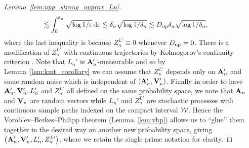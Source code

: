 \begin{proof}[Lemma~\ref{lem:app_strong_approx_Ln}]
\begin{align*}
    &\lesssim
    \int_0^{\delta_n}
    \sqrt{\log 1/\varepsilon}
    \,\mathrm{d}\varepsilon
    \lesssim
    \delta_n \sqrt{\log 1/\delta_n}
    \lesssim
    D_{\textup{up}}
    \delta_n \sqrt{\log 1/\delta_n},
  \end{align*}
  where the last inequality is because
  $Z_n^{L\prime} \equiv 0$ whenever $D_{\textup{up}} = 0$.
  There is a modification of $Z_n^{L\prime}$
  with continuous trajectories
  by Kolmogorov's continuity criterion
  \citep[Theorem~2.9]{legall2016brownian}.
  Note that $L_n'$ is $\mathbf{A}_n'$-measurable
  and so by Lemma~\ref{lem:kmt_corollary}
  we can assume that $Z_n^{L\prime}$
  depends only on $\mathbf{A}_n'$ and some
  random noise which is independent of
  $(\mathbf{A}_n', \mathbf{V}_n')$.
  Finally in order to have
  $\mathbf{A}_n', \mathbf{V}_n', L_n'$ and $Z_n^{L\prime}$
  all defined on the same probability space,
  we note that $\mathbf{A}_n$ and $\mathbf{V}_n$ are random vectors
  while $L_n'$ and $Z_n^{L\prime}$
  are stochastic processes
  with continuous sample paths
  indexed on
  the compact interval $\mathcal{W}$.
  Hence the Vorob'ev--Berkes--Philipp theorem
  (Lemma~\ref{lem:vbp})
  allows us to ``glue'' them together
  in the desired way
  on another new probability space,
  giving
  $\big(\mathbf{A}_n', \mathbf{V}_n', L_n', Z_n^{L\prime}\big)$,
  where we retain the single prime notation for clarity.
\end{proof}

